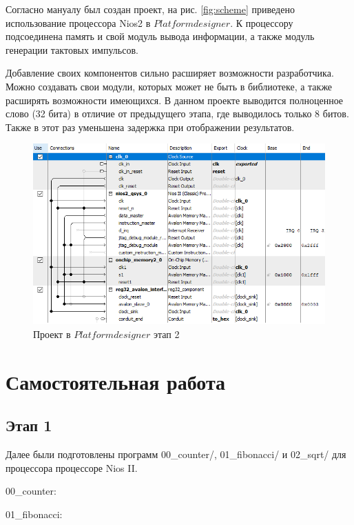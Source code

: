 \documentclass[a4paper,14pt]{article}
\begin{document}
	Согласно мануалу был создан проект, на рис. \ref{fig:scheme} приведено использование процессора Nios2 в $Platform designer$.
	К процессору подсоединена память и свой модуль вывода информации, а также модуль генерации тактовых импульсов.
	
	Добавление своих компонентов сильно расширяет возможности разработчика.
	Можно создавать свои модули, которых может не быть в библиотеке, а также расширять возможности имеющихся.
	В данном проекте выводится полноценное слово (32 бита) в отличие от предыдущего этапа, где выводилось только 8 битов.
	Также в этот раз уменьшена задержка при отображении результатов.
	
	\begin{figure}[h]
		\centering
		\includegraphics[width=0.9\linewidth]{images/scheme1}
		\caption{Проект в $Platform designer$ этап 2}
		\label{fig:scheme1}
	\end{figure}
	

	\section{Самостоятельная работа}
	
	\subsection{Этап 1}
	
	Далее были подготовлены программ 00\_counter/, 01\_fibonacci/ и 02\_sqrt/ для процессора процессоре Nios II.
	
	00\_counter:
	
	{\small {}}
	
	01\_fibonacci:
	
	{\small {}}
	
\end{document}
